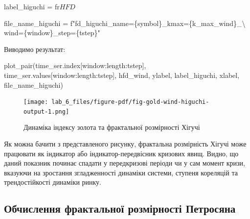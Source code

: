 \documentclass[
  letterpaper,
]{report}
\newenvironment{Shaded}{\begin{snugshade}}{\end{snugshade}}
\newcommand{\CharTok}[1]{\textcolor[rgb]{0.13,0.47,0.30}{#1}}
\newcommand{\NormalTok}[1]{\textcolor[rgb]{0.00,0.23,0.31}{#1}}
\newcommand{\OperatorTok}[1]{\textcolor[rgb]{0.37,0.37,0.37}{#1}}
\newcommand{\SpecialCharTok}[1]{\textcolor[rgb]{0.37,0.37,0.37}{#1}}
\newcommand{\SpecialStringTok}[1]{\textcolor[rgb]{0.13,0.47,0.30}{#1}}
\newcommand{\VerbatimStringTok}[1]{\textcolor[rgb]{0.13,0.47,0.30}{#1}}
\begin{document}
\begin{Shaded}
\begin{Highlighting}[]
\NormalTok{label\_higuchi }\OperatorTok{=} \VerbatimStringTok{fr\textquotesingle{}$HFD$\textquotesingle{}}

\NormalTok{file\_name\_higuchi }\OperatorTok{=} \SpecialStringTok{f"fd\_higuchi\_name=}\SpecialCharTok{\{}\NormalTok{symbol}\SpecialCharTok{\}}\SpecialStringTok{\_kmax=}\SpecialCharTok{\{}\NormalTok{k\_max\_wind}\SpecialCharTok{\}}\SpecialStringTok{\_}\CharTok{\textbackslash{}}
\SpecialStringTok{           wind=}\SpecialCharTok{\{}\NormalTok{window}\SpecialCharTok{\}}\SpecialStringTok{\_step=}\SpecialCharTok{\{}\NormalTok{tstep}\SpecialCharTok{\}}\SpecialStringTok{"}
\end{Highlighting}
\end{Shaded}

Виводимо результат:

\begin{Shaded}
\begin{Highlighting}[]
\NormalTok{plot\_pair(time\_ser.index[window:length:tstep],}
\NormalTok{          time\_ser.values[window:length:tstep],}
\NormalTok{          hfd\_wind, }
\NormalTok{          ylabel, }
\NormalTok{          label\_higuchi,}
\NormalTok{          xlabel,}
\NormalTok{          file\_name\_higuchi)}
\end{Highlighting}
\end{Shaded}

\begin{figure}[H]

{\centering \texttt{[image: lab\_6\_files/figure-pdf/fig-gold-wind-higuchi-output-1.png]}

}

\caption{\label{fig-gold-wind-higuchi}Динаміка індексу золота та
фрактальної розмірності Хігучі}

\end{figure}

Як можна бачити з представленого рисунку, фрактальна розмірність Хігучі
може працювати як індикатор або індикатор-передвісник кризових явищ.
Видно, що даний показник починає спадати у передкризові періоди чи у сам
момент кризи, вказуючи на зростання згладженності динаміки системи,
ступеня кореляцій та трендостійкості динаміки ринку.

\hypertarget{ux43eux431ux447ux438ux441ux43bux435ux43dux43dux44f-ux444ux440ux430ux43aux442ux430ux43bux44cux43dux43eux457-ux440ux43eux437ux43cux456ux440ux43dux43eux441ux442ux456-ux43fux435ux442ux440ux43eux441ux44fux43dux430}{%
\subsection{Обчислення фрактальної розмірності
Петросяна}\label{ux43eux431ux447ux438ux441ux43bux435ux43dux43dux44f-ux444ux440ux430ux43aux442ux430ux43bux44cux43dux43eux457-ux440ux43eux437ux43cux456ux440ux43dux43eux441ux442ux456-ux43fux435ux442ux440ux43eux441ux44fux43dux430}}
\end{document}
